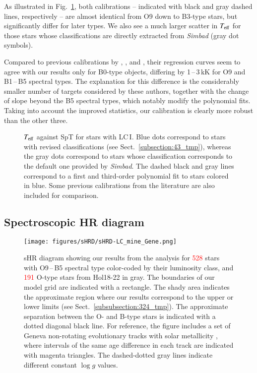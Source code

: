 \documentclass{aa}
\newcommand{\Teff}{\mbox{$T_{\rm eff}$}\xspace}
\newcommand{\logg}{\mbox{$\log g$}\xspace}
\newcommand{\num}[1]{\textcolor{red}{#1}}
\begin{document}
As illustrated in Fig.~\ref{fig:calib_spt}, both calibrations -- indicated with black and gray dashed lines, respectively -- are almost identical from O9 down to B3-type stars, but significantly differ for later types. We also see a much larger scatter in \Teff for those stars whose classifications are directly extracted from \textit{Simbad} (gray dot symbols).

Compared to previous calibrations by \citet{lefever07}, \citet{markova08}, and \citet{haucke18}, their regression curves seem to agree with our results only for B0-type objects, differing by 1\,--\,3\,kK for O9 and B1\,--\,B5 spectral types. The explanation for this difference is the considerably smaller number of targets considered by these authors, together with the change of slope beyond the B5 spectral types, which notably modify the polynomial fits. Taking into account the improved statistics, our calibration is clearly more robust than the other three.

\begin{figure}[!t]
\centering
{}
\caption{\Teff against SpT for stars with LC\,I. Blue dots correspond to stars with revised classifications (see Sect.~\ref{subsection:43_tmp}), whereas the gray dots correspond to stars whose classification corresponds to the default one provided by \textit{Simbad}.
The dashed black and gray lines correspond to a first and third-order polynomial fit to stars colored in blue. 
Some previous calibrations from the literature are also included for comparison.}
\label{fig:calib_spt}
\end{figure}




\subsection{Spectroscopic HR diagram}
\label{subsection:44_tmp}

\begin{figure*}[t!]
\centering
\texttt{[image: figures/sHRD/sHRD-LC\_mine\_Gene.png]}
\caption{sHR diagram showing our results from the analysis for \num{528} stars with O9\,--\,B5 spectral type color-coded by their luminosity class, and \num{191} O-type stars from Hol18-22 in gray. 
The boundaries of our model grid are indicated with a rectangle. The shady area indicates the approximate region where our results correspond to the upper or lower limits (see Sect.~\ref{subsubsection:324_tmp}). The approximate separation between the O- and B-type stars is indicated with a dotted diagonal black line. 
For reference, the figure includes a set of Geneva non-rotating evolutionary tracks with solar metallicity \citep{ekstrom12, georgy13}, where intervals of the same age difference in each track are indicated with magenta triangles. The dashed-dotted gray lines indicate different constant \logg values.}
\label{fig:shrd}
\end{figure*}
\end{document}

